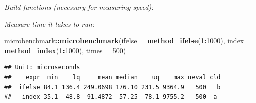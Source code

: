 \documentclass[]{book}
\newenvironment{Shaded}{\begin{snugshade}}{\end{snugshade}}
\newcommand{\ControlFlowTok}[1]{\textcolor[rgb]{0.13,0.29,0.53}{\textbf{#1}}}
\newcommand{\DataTypeTok}[1]{\textcolor[rgb]{0.13,0.29,0.53}{#1}}
\newcommand{\DecValTok}[1]{\textcolor[rgb]{0.00,0.00,0.81}{#1}}
\newcommand{\KeywordTok}[1]{\textcolor[rgb]{0.13,0.29,0.53}{\textbf{#1}}}
\newcommand{\NormalTok}[1]{#1}
\newcommand{\OperatorTok}[1]{\textcolor[rgb]{0.81,0.36,0.00}{\textbf{#1}}}
\newcommand{\StringTok}[1]{\textcolor[rgb]{0.31,0.60,0.02}{#1}}
\theoremstyle{definition}
\theoremstyle{definition}
\theoremstyle{definition}
\theoremstyle{remark}
\begin{document}
\emph{Build functions (necessary for measuring speed): }

\begin{Shaded}
\end{Shaded}

\emph{Measure time it takes to run: }

\begin{Shaded}
\begin{Highlighting}[]
\NormalTok{microbenchmark}\OperatorTok{::}\KeywordTok{microbenchmark}\NormalTok{(}\DataTypeTok{ifelse =} \KeywordTok{method_ifelse}\NormalTok{(}\DecValTok{1}\OperatorTok{:}\DecValTok{1000}\NormalTok{),}
                               \DataTypeTok{index =} \KeywordTok{method_index}\NormalTok{(}\DecValTok{1}\OperatorTok{:}\DecValTok{1000}\NormalTok{),}
                               \DataTypeTok{times =} \DecValTok{500}\NormalTok{)}
\end{Highlighting}
\end{Shaded}

\begin{verbatim}
## Unit: microseconds
##    expr  min    lq     mean median    uq    max neval cld
##  ifelse 84.1 136.4 249.0698 176.10 231.5 9364.9   500   b
##   index 35.1  48.8  91.4872  57.25  78.1 9755.2   500  a
\end{verbatim}
\end{document}
